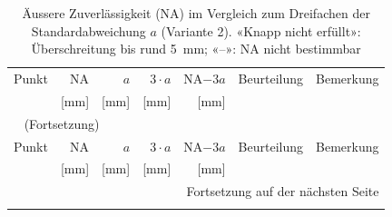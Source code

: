 {\small
\begin{longtable}{p{1.6cm} r r r r l p{3.6cm}}
  \caption{Äussere Zuverlässigkeit (NA) im Vergleich zum Dreifachen der
  Standardabweichung $a$ (Variante 2). «Knapp nicht erfüllt»:
  Überschreitung bis rund 5~mm; «--»: NA nicht bestimmbar}
  \label{tab:vergleich-na-3a} \\
  \toprule
  Punkt & NA & $a$ & $3\cdot a$ & NA$-3a$ & Beurteilung & Bemerkung \\
        & [mm] & [mm] & [mm] & [mm] & & \\
  \midrule
  \endfirsthead

  \multicolumn{7}{l}{\footnotesize\tablename~\thetable{} (Fortsetzung)} \\
  \toprule
  Punkt & NA & $a$ & $3\cdot a$ & NA$-3a$ & Beurteilung & Bemerkung \\
        & [mm] & [mm] & [mm] & [mm] & & \\
  \midrule
  \endhead

  \midrule
  \multicolumn{7}{r}{\footnotesize Fortsetzung auf der nächsten Seite} \\
  \endfoot

  \bottomrule
  \endlastfoot


\end{longtable}}
